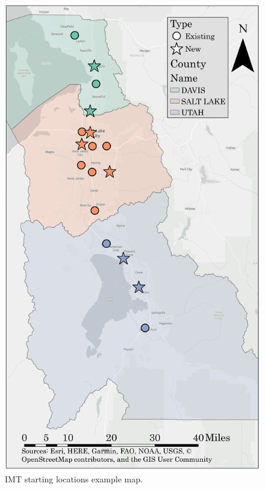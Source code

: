 \documentclass[fancy, oneside, mastersfancy, ms]{byuthesis}
\begin{document}
\begin{figure}

{\centering \includegraphics{figures/imt_gray_map.png}

}

\caption{\label{fig-IMT-Map}IMT starting locations example map.}

\end{figure}
\end{document}
